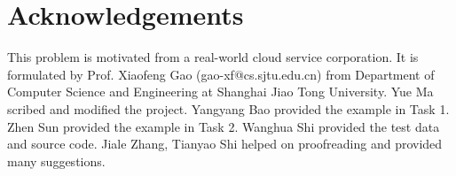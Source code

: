 \documentclass{llncs}
\begin{document}
\section*{Acknowledgements}
This problem is motivated from a real-world cloud service corporation. It is formulated by Prof. Xiaofeng Gao (gao-xf@cs.sjtu.edu.cn) from Department of Computer Science and Engineering at Shanghai Jiao Tong University. Yue Ma scribed and modified the project. Yangyang Bao provided the example in Task 1. Zhen Sun provided the example in Task 2. Wanghua Shi provided the test data and source code. Jiale Zhang, Tianyao Shi helped on proofreading and provided many suggestions.


%
%
%
%
% 
%
\end{document}
